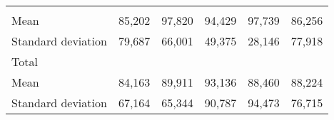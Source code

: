 \begin{tabular}{llllll}
  \multicolumn{1}{|r}{} &
  \multicolumn{1}{r}{} &
  \multicolumn{1}{r}{} &
  \multicolumn{1}{r}{} &
  \multicolumn{1}{r}{} \\
\multicolumn{1}{l}{\hspace{4em}Mean} &
  \multicolumn{1}{|r}{85,202} &
  \multicolumn{1}{r}{97,820} &
  \multicolumn{1}{r}{94,429} &
  \multicolumn{1}{r}{97,739} &
  \multicolumn{1}{r}{86,256} \\
\multicolumn{1}{l}{\hspace{4em}Standard deviation} &
  \multicolumn{1}{|r}{79,687} &
  \multicolumn{1}{r}{66,001} &
  \multicolumn{1}{r}{49,375} &
  \multicolumn{1}{r}{28,146} &
  \multicolumn{1}{r}{77,918} \\
\multicolumn{1}{l}{\hspace{3em}Total} &
  \multicolumn{1}{|r}{} &
  \multicolumn{1}{r}{} &
  \multicolumn{1}{r}{} &
  \multicolumn{1}{r}{} &
  \multicolumn{1}{r}{} \\
\multicolumn{1}{l}{\hspace{4em}Mean} &
  \multicolumn{1}{|r}{84,163} &
  \multicolumn{1}{r}{89,911} &
  \multicolumn{1}{r}{93,136} &
  \multicolumn{1}{r}{88,460} &
  \multicolumn{1}{r}{88,224} \\
\multicolumn{1}{l}{\hspace{4em}Standard deviation} &
  \multicolumn{1}{|r}{67,164} &
  \multicolumn{1}{r}{65,344} &
  \multicolumn{1}{r}{90,787} &
  \multicolumn{1}{r}{94,473} &
  \multicolumn{1}{r}{76,715} \\
\cline{1-6}
\end{tabular}

